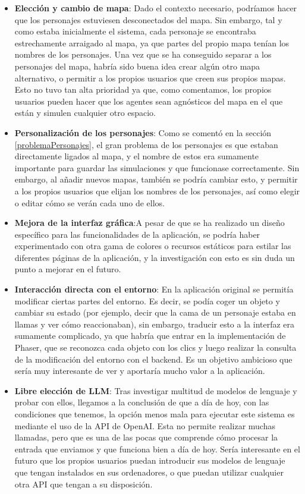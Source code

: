 \begin{itemize}
	\item \textbf{Elección y cambio de mapa}: Dado el contexto necesario, podríamos hacer que los personajes estuviesen desconectados del mapa. Sin embargo, tal y como estaba inicialmente el sistema, cada personaje se encontraba estrechamente arraigado al mapa, ya que partes del propio mapa tenían los nombres de los personajes. Una vez que se ha conseguido separar a los personajes del mapa, habría sido buena idea crear algún otro mapa alternativo, o permitir a los propios usuarios que creen sus propios mapas. Esto no tuvo tan alta prioridad ya que, como comentamos, los propios usuarios pueden hacer que los agentes sean agnósticos del mapa en el que están y simulen cualquier otro espacio.
	
	\item \textbf{Personalización de los personajes}: Como se comentó en la sección \ref{problemaPersonajes}, el gran problema de los personajes es que estaban directamente ligados al mapa, y el nombre de estos era sumamente importante para guardar las simulaciones y que funcionase correctamente. Sin embargo, al añadir nuevos mapas, también se podría cambiar esto, y permitir a los propios usuarios que elijan los nombres de los personajes, así como elegir o editar cómo se verán cada uno de ellos.
	
	\item \textbf{Mejora de la interfaz gráfica}:A pesar de que se ha realizado un diseño específico para las funcionalidades de la aplicación, se podría haber experimentado con otra gama de colores o recursos estáticos para estilar las diferentes páginas de la aplicación, y la investigación con esto es sin duda un punto a mejorar en el futuro.
	
	\item \textbf{Interacción directa con el entorno}: En la aplicación original se permitía modificar ciertas partes del entorno. Es decir, se podía coger un objeto y cambiar su estado (por ejemplo, decir que la cama de un personaje estaba en llamas y ver cómo reaccionaban), sin embargo, traducir esto a la interfaz era sumamente complicado, ya que habría que entrar en la implementación de Phaser, que se reconozca cada objeto con los clics y luego realizar la consulta de la modificación del entorno con el backend. Es un objetivo ambicioso que sería muy interesante de ver y aportaría mucho valor a la aplicación.
	
	\item \textbf{Libre elección de LLM}: Tras investigar multitud de modelos de lenguaje y probar con ellos, llegamos a la conclusión de que a día de hoy, con las condiciones que tenemos, la opción menos mala para ejecutar este sistema es mediante el uso de la API de OpenAI. Esta no permite realizar muchas llamadas, pero que es una de las pocas que comprende cómo procesar la entrada que enviamos y que funciona bien a día de hoy. Sería interesante en el futuro que los propios usuarios puedan introducir sus modelos de lenguaje que tengan instalados en sus ordenadores, o que puedan utilizar cualquier otra API que tengan a su disposición.
	

\end{itemize}
